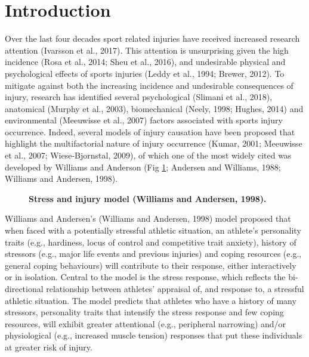 \documentclass[utf8]{frontiersHLTH}
\begin{document}
\hypertarget{introduction}{%
\section*{Introduction}\label{introduction}}

Over the last four decades sport related injuries have received
increased research attention (Ivarsson et al., 2017). This attention is
unsurprising given the high incidence (Rosa et al., 2014; Sheu et al.,
2016), and undesirable physical and psychological effects of sports
injuries (Leddy et al., 1994; Brewer, 2012). To mitigate against both
the increasing incidence and undesirable consequences of injury,
research has identified several psychological (Slimani et al., 2018),
anatomical (Murphy et al., 2003), biomechanical (Neely, 1998; Hughes,
2014) and environmental (Meeuwisse et al., 2007) factors associated with
sports injury occurrence. Indeed, several models of injury causation
have been proposed that highlight the multifactorial nature of injury
occurrence (Kumar, 2001; Meeuwisse et al., 2007; Wiese-Bjornstal, 2009),
of which one of the most widely cited was developed by Williams and
Anderson (Fig \ref{fig:fig1}; Andersen and Williams, 1988; Williams and
Andersen, 1998).

\begin{figure}[!h]
\caption{{\bf Stress and injury model (Williams and Andersen, 1998).}}
\label{fig:fig1}
\end{figure}

Williams and Andersen's (Williams and Andersen, 1998) model proposed
that when faced with a potentially stressful athletic situation, an
athlete's personality traits (e.g., hardiness, locus of control and
competitive trait anxiety), history of stressors (e.g., major life
events and previous injuries) and coping resources (e.g., general coping
behaviours) will contribute to their response, either interactively or
in isolation. Central to the model is the stress response, which
reflects the bi-directional relationship between athletes' appraisal of,
and response to, a stressful athletic situation. The model predicts that
athletes who have a history of many stressors, personality traits that
intensify the stress response and few coping resources, will exhibit
greater attentional (e.g., peripheral narrowing) and/or physiological
(e.g., increased muscle tension) responses that put these individuals at
greater risk of injury.
\end{document}
